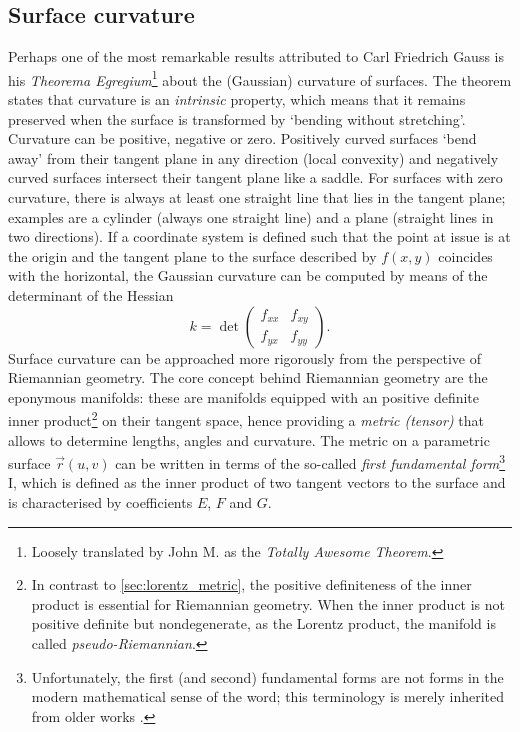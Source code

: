 \subsection{Surface curvature}
\label{ssec:curvature}
Perhaps one of the most remarkable results attributed to Carl Friedrich Gauss is his \emph{Theorema Egregium}\footnote{Loosely translated by John M. \citet{Lee1997} as the \emph{Totally Awesome Theorem}.} about the (Gaussian) curvature of surfaces. The theorem states that curvature is an \emph{intrinsic} property, which means that it remains preserved when the surface is transformed by `bending without stretching'. Curvature can be positive, negative or zero. Positively curved surfaces `bend away' from their tangent plane in any direction (local convexity) and negatively curved surfaces intersect their tangent plane like a saddle. For surfaces with zero curvature, there is always at least one straight line that lies in the tangent plane; examples are a cylinder (always one straight line) and a plane (straight lines in two directions). If a coordinate system is defined such that the point at issue is at the origin and the tangent plane to the surface described by \(f(x, y)\) coincides with the horizontal, the Gaussian curvature can be computed by means of the determinant of the Hessian \cite{Thurston1997, ONeill2006}
    \[ 
        k = \det \begin{pmatrix}
                f_{xx} & f_{xy}\\
                f_{yx} & f_{yy}
        \end{pmatrix}.
    \]
    Surface curvature can be approached more rigorously from the perspective of Riemannian geometry. The core concept behind Riemannian geometry are the eponymous manifolds: these are manifolds equipped with an positive definite inner product\footnote{In contrast to \cref{sec:lorentz_metric}, the positive definiteness of the inner product is essential for Riemannian geometry. When the inner product is not positive definite but nondegenerate, as the Lorentz product, the manifold is called \emph{pseudo-Riemannian}.} on their tangent space, hence providing a \emph{metric (tensor)} that allows to determine lengths, angles and curvature. The metric on a parametric surface \(\vec{r}(u, v)\) can be written in terms of the so-called \emph{first fundamental form}\footnote{Unfortunately, the first (and second) fundamental forms are not forms in the modern mathematical sense of the word; this terminology is merely inherited from older works \cite{Spivak1999b}.} I, which is defined as the inner product of two tangent vectors to the surface  and is characterised by coefficients \(E\), \(F\) and \(G\).
